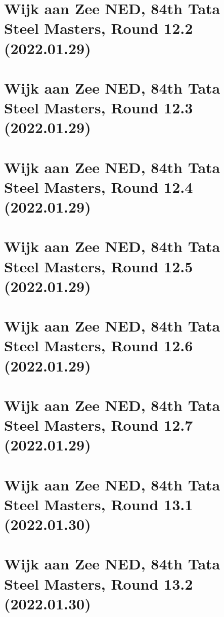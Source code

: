 \documentclass[11pt]{article}
\newcommand*\cleartoleftpage{%
   \clearpage
   \ifodd\value{page}\hbox{}\newpage\fi
}
\begin{document}
\cleartoleftpage

\section{Wijk aan Zee NED, 84th Tata Steel Masters, Round 12.2 (2022.01.29)}


\cleartoleftpage

\section{Wijk aan Zee NED, 84th Tata Steel Masters, Round 12.3 (2022.01.29)}


\cleartoleftpage

\section{Wijk aan Zee NED, 84th Tata Steel Masters, Round 12.4 (2022.01.29)}


\cleartoleftpage

\section{Wijk aan Zee NED, 84th Tata Steel Masters, Round 12.5 (2022.01.29)}


\cleartoleftpage

\section{Wijk aan Zee NED, 84th Tata Steel Masters, Round 12.6 (2022.01.29)}


\cleartoleftpage

\section{Wijk aan Zee NED, 84th Tata Steel Masters, Round 12.7 (2022.01.29)}


\cleartoleftpage

\section{Wijk aan Zee NED, 84th Tata Steel Masters, Round 13.1 (2022.01.30)}


\cleartoleftpage

\section{Wijk aan Zee NED, 84th Tata Steel Masters, Round 13.2 (2022.01.30)}

\end{document}
